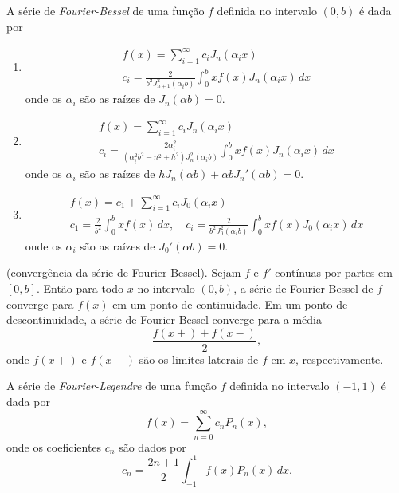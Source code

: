 \documentclass{article}
\begin{document}
\begin{defn}
    A série de \emph{Fourier-Bessel} de uma função \(f\) definida no intervalo \((0,b)\) é dada por
    \begin{enumerate}
        \item [(i)] \begin{gather}
            f(x) = \sum_{i=1}^{\infty} c_i J_n(\alpha_{i}x) \\
            c_i = \frac{2}{b^2 J_{n+1}^2(\alpha_i b)} \int_0^b x f(x) J_n(\alpha_i x) \, dx
        \end{gather}
        \noindent onde os \(\alpha_i\) são as raízes de \(J_n(\alpha b) = 0\).
        \item [(ii)] \begin{gather}
            f(x) = \sum_{i=1}^{\infty} c_i J_n(\alpha_{i}x) \\
            c_i = \frac{2\alpha_{i}^2}{(\alpha_{i}^2 b^2 - n^2 + h^2)J_n^2(\alpha_i b)} \int_0^b x f(x) J_n(\alpha_i x) \, dx
        \end{gather}
        \noindent onde os \(\alpha_i\) são as raízes de \(h J_n(\alpha b) + \alpha b J_n'(\alpha b) = 0\).
        \item [(iii)] \begin{gather}
            f(x) = c_1 + \sum_{i=1}^{\infty} c_i J_0(\alpha_{i}x) \\
            c_1 = \frac{2}{b^2} \int_0^b x f(x) \, dx, \quad c_i = \frac{2}{b^2 J_0^2(\alpha_i b)} \int_0^b x f(x) J_0(\alpha_i x) \, dx
        \end{gather}
        \noindent onde os \(\alpha_i\) são as raízes de \(J_0'(\alpha b) = 0\).
    \end{enumerate}
\end{defn}

\begin{prop} (convergência da série de Fourier-Bessel).
    Sejam \(f\) e \(f'\) contínuas por partes em \([0,b]\). Então para todo \(x\) no intervalo \((0,b)\), a série de Fourier-Bessel de \(f\) converge para \(f(x)\) em um ponto de continuidade. Em um ponto de descontinuidade, a série de Fourier-Bessel converge para a média
    \begin{equation*}
        \frac{f(x+) + f(x-)}{2},
    \end{equation*}
    \noindent onde \(f(x+)\) e \(f(x-)\) são os limites laterais de \(f\) em \(x\), respectivamente.
\end{prop}

\begin{defn}
    A série de \emph{Fourier-Legendre} de uma função \(f\) definida no intervalo \((-1,1)\) é dada por
    \begin{equation}
        f(x) = \sum_{n=0}^{\infty} c_n P_n(x),
    \end{equation}
    \noindent onde os coeficientes \(c_n\) são dados por
    \begin{equation}
        c_n = \frac{2n+1}{2} \int_{-1}^{1} f(x) P_n(x) \, dx.
\end{equation}
\end{defn}
\end{document}
